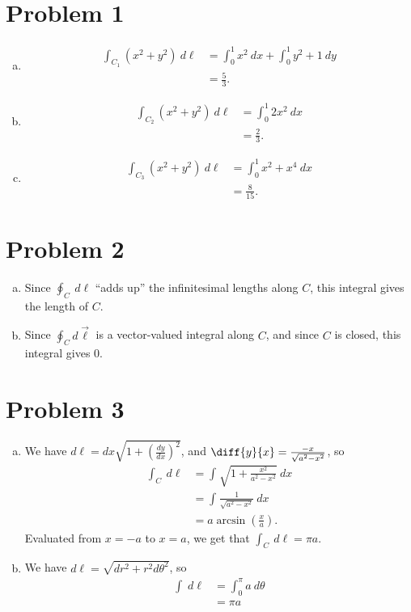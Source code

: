\documentclass[10pt]{mypackage}
\begin{document}
\RaggedRight
\section{Problem 1}%
\begin{enumerate}[(a)]
  \item 
    \begin{align*}
      \int_{C_1}^{} \left(x^2 + y^2\right)\:d\ell &= \int_{0}^{1} x^2\:dx + \int_{0}^{1} y^2 + 1\:dy\\
                                               &= \frac{5}{3}.
    \end{align*}
  \item 
    \begin{align*}
      \int_{C_2}^{} \left(x^2 + y^2\right)\:d\ell &= \int_{0}^{1} 2x^2\:dx\\
                                                  &= \frac{2}{3}.
    \end{align*}
  \item 
    \begin{align*}
      \int_{C_3}^{} \left(x^2 + y^2\right)\:d\ell &= \int_{0}^{1} x^2 + x^4\:dx\\
                                                  &= \frac{8}{15}.
    \end{align*}
\end{enumerate}
\section{Problem 2}%
\begin{enumerate}[(a)]
  \item Since $\oint_{C}\:d\ell$ ``adds up'' the infinitesimal lengths along $C$, this integral gives the length of $C$.
  \item Since $\oint_{C}d\vec{\ell}$ is a vector-valued integral along $C$, and since $C$ is closed, this integral gives $0$.
\end{enumerate}
\section{Problem 3}%
\begin{enumerate}[(a)]
  \item We have $d\ell = dx\sqrt{1 + \left(\frac{dy}{dx}\right)^2}$, and $\diff{y}{x} = \frac{-x}{\sqrt{a^2 - x^2}}$, so
    \begin{align*}
      \int_{C}^{} \:d\ell &= \int_{}^{} \sqrt{1 + \frac{x^2}{a^2 - x^2}}\:dx\\
                          &= \int_{}^{} \frac{1}{\sqrt{a^2 - x^2}}\:dx\\
                          &= a\arcsin\left(\frac{x}{a}\right).
    \end{align*}
    Evaluated from $x = -a$ to $x = a$, we get that $\int_{C}^{} \:d\ell = \pi a$.
  \item We have $d\ell = \sqrt{dr^2 + r^2d\theta^2}$, so
    \begin{align*}
      \int_{}^{} \:d\ell &= \int_{0}^{\pi} a\:d\theta\\
                         &= \pi a
    \end{align*}
\end{enumerate}
\end{document}
